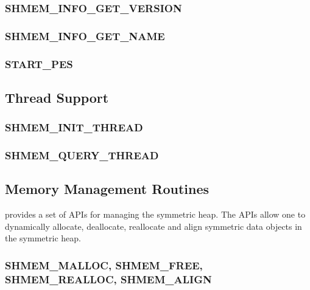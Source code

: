 \documentclass[10pt]{book}
\begin{document}
\subsubsection{\textbf{SHMEM\_INFO\_GET\_VERSION}}\label{subsec:shmem_info_get_version}


\subsubsection{\textbf{SHMEM\_INFO\_GET\_NAME}}\label{subsec:shmem_info_get_name}


\subsubsection{\textbf{START\_PES}}\label{subsec:start_pes}


\subsection{Thread Support}
\label{subsec:thread_support}


\subsubsection{\textbf{SHMEM\_INIT\_THREAD}}
\label{subsec:shmem_init_thread}


\subsubsection{\textbf{SHMEM\_QUERY\_THREAD}}
\label{subsec:shmem_query_thread}



\subsection{Memory Management Routines}
\label{sec:memory_management}

\openshmem provides a set of \acp{API} for managing the symmetric heap. The
\acp{API} allow one to dynamically allocate, deallocate, reallocate and align
symmetric data objects in the symmetric heap.

\subsubsection{\textbf{SHMEM\_MALLOC, SHMEM\_FREE, SHMEM\_REALLOC, SHMEM\_ALIGN}}\label{subsec:shfree}

\end{document}
